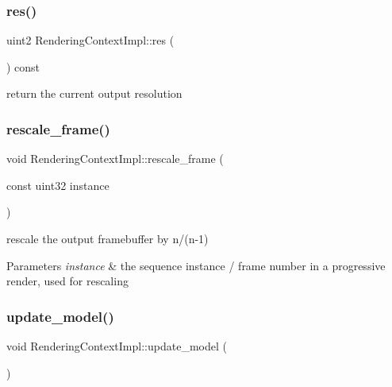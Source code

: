 \subsubsection{\texorpdfstring{res()}{res()}}
{\footnotesize\ttfamily uint2 Rendering\+Context\+Impl\+::res (\begin{DoxyParamCaption}{ }\end{DoxyParamCaption}) const\hspace{0.3cm}{\ttfamily [inline]}}

return the current output resolution \mbox{\label{struct_rendering_context_impl_a12645d5a60a56769cd816a3e4733687b}} 
\subsubsection{\texorpdfstring{rescale\+\_\+frame()}{rescale\_frame()}}
{\footnotesize\ttfamily void Rendering\+Context\+Impl\+::rescale\+\_\+frame (\begin{DoxyParamCaption}\item[{const uint32}]{instance }\end{DoxyParamCaption})}

rescale the output framebuffer by n/(n-\/1)


\begin{DoxyParams}{Parameters}
{\em instance} & the sequence instance / frame number in a progressive render, used for rescaling \\
\hline
\end{DoxyParams}
\mbox{\label{struct_rendering_context_impl_a56fb48c6ec74446e25a8c3cc95a291c7}} 
\subsubsection{\texorpdfstring{update\+\_\+model()}{update\_model()}}
{\footnotesize\ttfamily void Rendering\+Context\+Impl\+::update\+\_\+model (\begin{DoxyParamCaption}{ }\end{DoxyParamCaption})}

